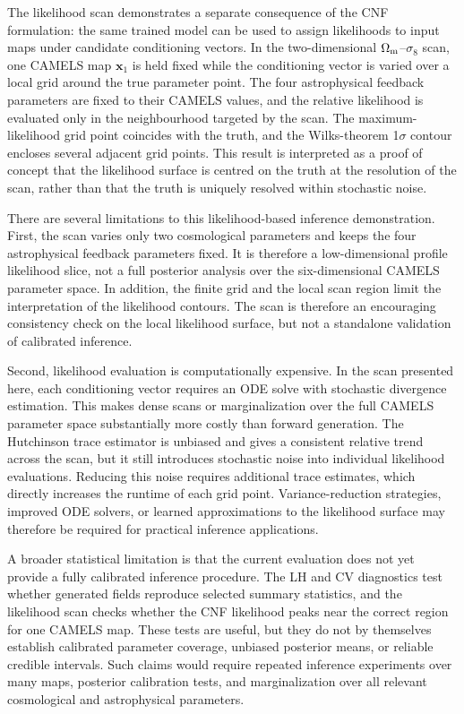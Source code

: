 \documentclass[usenatbib]{mnras}
\newcommand{\Om}{\Omega_{\rm m}}
\newcommand{\sig}{\sigma_8}
\begin{document}
The likelihood scan demonstrates a separate consequence of the CNF
formulation: the same trained model can be used to assign likelihoods
to input maps under candidate conditioning vectors. In the
two-dimensional $\Om$--$\sig$ scan, one CAMELS map $\mathbf{x}_1$ is
held fixed while the conditioning vector is varied over a local grid
around the true parameter point. The four astrophysical feedback
parameters are fixed to their CAMELS values, and the relative
likelihood is evaluated only in the neighbourhood targeted by the
scan. The maximum-likelihood grid point coincides with the truth, and
the Wilks-theorem 1$\sigma$ contour encloses several adjacent grid
points. This result is interpreted as a proof of concept that the
likelihood surface is centred on the truth at the resolution of the
scan, rather than that the truth is uniquely resolved within stochastic
noise.

There are several limitations to this likelihood-based inference
demonstration. First, the scan varies only two cosmological parameters
and keeps the four astrophysical feedback parameters fixed. It is
therefore a low-dimensional profile likelihood slice, not a full
posterior analysis over the six-dimensional CAMELS parameter space. In
addition, the finite grid and the local scan region limit the
interpretation of the likelihood contours. The scan is therefore an
encouraging consistency check on the local likelihood surface, but not
a standalone validation of calibrated inference.

Second, likelihood evaluation is computationally expensive. In the
scan presented here, each conditioning vector requires an ODE solve
with stochastic divergence estimation. This makes dense scans or
marginalization over the full CAMELS parameter space substantially more
costly than forward generation. The Hutchinson trace estimator is
unbiased and gives a consistent relative trend across the scan, but it
still introduces stochastic noise into individual likelihood
evaluations. Reducing this noise requires additional trace estimates,
which directly increases the runtime of each grid point.
Variance-reduction strategies, improved ODE solvers, or learned
approximations to the likelihood surface may therefore be required for
practical inference applications.

A broader statistical limitation is that the current evaluation does
not yet provide a fully calibrated inference procedure. The LH and CV
diagnostics test whether generated fields reproduce selected summary
statistics, and the likelihood scan checks whether the CNF likelihood
peaks near the correct region for one CAMELS map. These tests are
useful, but they do not by themselves establish calibrated parameter
coverage, unbiased posterior means, or reliable credible intervals.
Such claims would require repeated inference experiments over many
maps, posterior calibration tests, and marginalization over all relevant
cosmological and astrophysical parameters.
\end{document}
